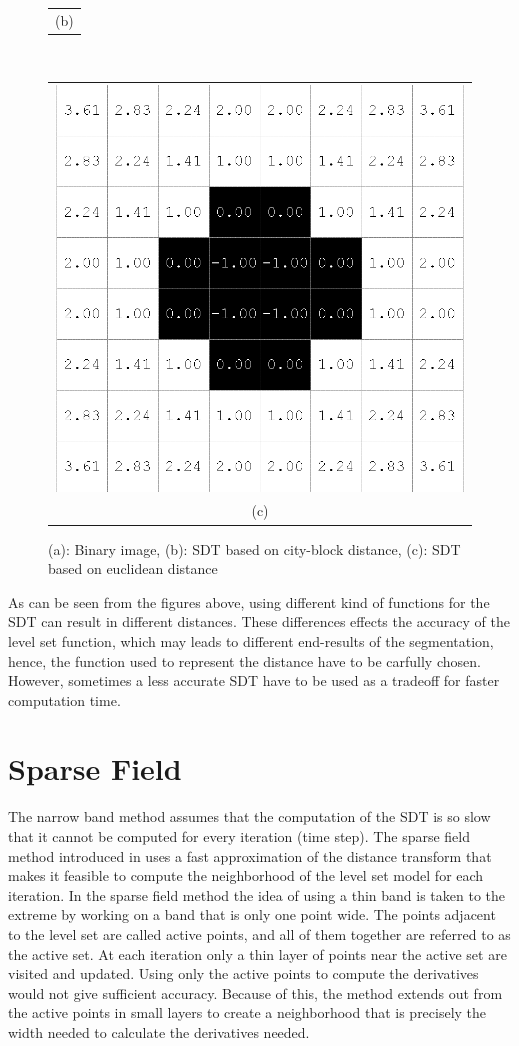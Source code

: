 \begin{figure}[h!]
\begin{minipage}{.45\textwidth}
\begin{tabular}{c}
(b)
\end{tabular}
\end{minipage}
\\
\begin{tabular}{c}
\includegraphics[width=.5\textwidth]{levelset/euclidean} \\
(c)
\end{tabular}
\caption{(a): Binary image, (b): SDT based on city-block distance, (c): SDT based on euclidean distance}
\label{SDT}
\end{figure}

As can be seen from the figures above, using different kind of functions for the SDT can result in different distances. These differences effects the accuracy of the level set function, which may leads to different end-results of the segmentation, hence, the function used to represent the distance have to be carfully chosen. However, sometimes a less accurate SDT have to be used as a tradeoff for faster computation time.

\section{Sparse Field}
The narrow band  method assumes that the computation of the SDT is so slow that it cannot be computed for every iteration (time step). The sparse field method introduced in \cite{whitaker89} uses a fast approximation of the distance transform that makes it feasible to compute the neighborhood of the level set model for each iteration. In the sparse field method the idea of using a thin band is taken to the extreme by working on a band that is only one point wide. The points adjacent to the level set are called active points, and all of them together are referred to as the active set. At each iteration only a thin layer of points near the active set are visited and updated. Using only the active points to compute the derivatives would not give sufficient accuracy. Because of this, the method extends out from the active points in small layers to create a neighborhood that is precisely the width needed to calculate the derivatives needed. 

